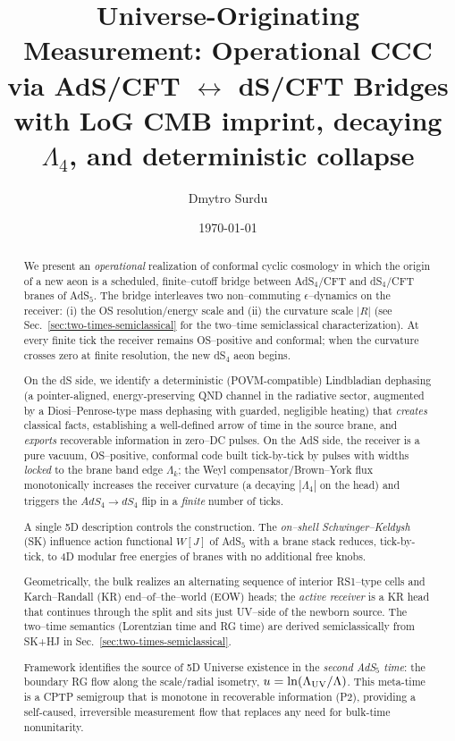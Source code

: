 \documentclass[10pt]{article}
\title{Universe-Originating Measurement: Operational CCC via AdS/CFT $\longleftrightarrow$ dS/CFT Bridges with LoG CMB imprint, decaying $\Lambda_4$, and deterministic collapse}
\author{Dmytro Surdu}
\date{\today}
\theoremstyle{definition}
\theoremstyle{plain}
\begin{document}
\maketitle

\begin{abstract}
We present an \emph{operational} realization of conformal cyclic cosmology in which the origin of a new aeon is a scheduled, finite--cutoff bridge between AdS$_4$/CFT and dS$_4$/CFT branes of AdS$_5$. The bridge interleaves two non--commuting $\epsilon$--dynamics on the receiver: (i) the OS resolution/energy scale and (ii) the curvature scale $|R|$ (see Sec.~\ref{sec:two-times-semiclassical} for the two--time semiclassical characterization). At every finite tick the receiver remains OS--positive and conformal; when the curvature crosses zero at finite resolution, the new dS$_4$ aeon begins.

On the dS side, we identify a deterministic (POVM-compatible) Lindbladian dephasing (a pointer-aligned, energy-preserving QND channel in the radiative sector, augmented by a Diosi--Penrose-type mass dephasing with guarded, negligible heating) that \emph{creates} classical facts, establishing a well-defined arrow of time in the source brane,  and \emph{exports} recoverable information in zero--DC pulses. On the AdS side, the receiver is a pure vacuum, OS--positive, conformal code built tick-by-tick by pulses with widths \emph{locked} to the brane band edge $\Lambda_k$; the Weyl compensator/Brown--York flux monotonically increases the receiver curvature (a decaying $\left | \Lambda_4 \right |$ on the head) and triggers the $AdS_4\rightarrow dS_4$ flip in a \emph{finite} number of ticks.

A single 5D description controls the construction. The \emph{on–shell Schwinger–Keldysh} (SK) influence action functional $W[J]$ of AdS$_5$ with a brane stack reduces, tick-by-tick, to 4D modular free energies of branes with no additional free knobs.

Geometrically, the bulk realizes an alternating sequence of interior RS1--type cells and Karch--Randall (KR) end--of--the--world (EOW) heads; the \emph{active receiver} is a KR head that continues through the split and sits just UV--side of the newborn source. The two--time semantics (Lorentzian time and RG time) are derived semiclassically from SK+HJ in Sec.~\ref{sec:two-times-semiclassical}.

Framework identifies the source of 5D Universe existence in the \emph{second AdS$_5$ time}: the boundary RG flow along the scale/radial isometry, $u=\ln(\Lambda_{\rm UV}/\Lambda)$. This meta-time is a CPTP semigroup that is monotone in recoverable information (P2), providing a self-caused, irreversible measurement flow that replaces any need for bulk-time nonunitarity.



\end{abstract}
\end{document}
